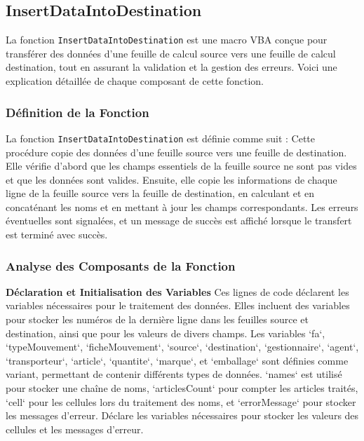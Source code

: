 \documentclass[a4paper, oneside, 12pt, final]{extreport}
\begin{document}
\subsection{InsertDataIntoDestination}

La fonction \texttt{InsertDataIntoDestination} est une macro VBA conçue pour transférer des données d'une feuille de calcul source vers une feuille de calcul destination, tout en assurant la validation et la gestion des erreurs. Voici une explication détaillée de chaque composant de cette fonction.

\subsubsection{Définition de la Fonction}

La fonction \texttt{InsertDataIntoDestination} est définie comme suit :
Cette procédure copie des données d'une feuille source vers une feuille de destination. Elle vérifie d'abord que les champs essentiels de la feuille source ne sont pas vides et que les données sont valides. Ensuite, elle copie les informations de chaque ligne de la feuille source vers la feuille de destination, en calculant et en concaténant les noms et en mettant à jour les champs correspondants. Les erreurs éventuelles sont signalées, et un message de succès est affiché lorsque le transfert est terminé avec succès.

\subsubsection{Analyse des Composants de la Fonction}

\textbf{Déclaration et Initialisation des Variables}
Ces lignes de code déclarent les variables nécessaires pour le traitement des données. Elles incluent des variables pour stocker les numéros de la dernière ligne dans les feuilles source et destination, ainsi que pour les valeurs de divers champs. Les variables `fa`, `typeMouvement`, `ficheMouvement`, `source`, `destination`, `gestionnaire`, `agent`, `transporteur`, `article`, `quantite`, `marque`, et `emballage` sont définies comme variant, permettant de contenir différents types de données. `names` est utilisé pour stocker une chaîne de noms, `articlesCount` pour compter les articles traités, `cell` pour les cellules lors du traitement des noms, et `errorMessage` pour stocker les messages d'erreur.
Déclare les variables nécessaires pour stocker les valeurs des cellules et les messages d'erreur.
\end{document}
